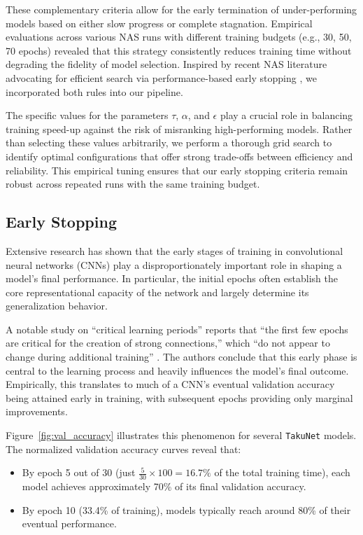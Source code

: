 These complementary criteria allow for the early termination of under-performing models based on either slow progress or complete stagnation. Empirical evaluations across various NAS runs with different training budgets (e.g., 30, 50, 70 epochs) revealed that this strategy consistently reduces training time without degrading the fidelity of model selection. Inspired by recent NAS literature advocating for efficient search via performance-based early stopping \cite{li2020random}, we incorporated both rules into our pipeline.

The specific values for the parameters \( \tau \), \( \alpha \), and \( \epsilon \) play a crucial role in balancing training speed-up against the risk of misranking high-performing models. Rather than selecting these values arbitrarily, we perform a thorough grid search to identify optimal configurations that offer strong trade-offs between efficiency and reliability. This empirical tuning ensures that our early stopping criteria remain robust across repeated runs with the same training budget.






\subsection{Early Stopping}
\label{sec:early_stopping}

Extensive research has shown that the early stages of training in convolutional neural networks (CNNs) play a disproportionately important role in shaping a model’s final performance. In particular, the initial epochs often establish the core representational capacity of the network and largely determine its generalization behavior.

A notable study on “critical learning periods” reports that “the first few epochs are critical for the creation of strong connections,” which “do not appear to change during additional training” \cite{achille2017critical}. The authors conclude that this early phase is central to the learning process and heavily influences the model’s final outcome. Empirically, this translates to much of a CNN’s eventual validation accuracy being attained early in training, with subsequent epochs providing only marginal improvements.

Figure~\ref{fig:val_accuracy} illustrates this phenomenon for several \texttt{TakuNet} models. The normalized validation accuracy curves reveal that:
\begin{itemize}
  \item By epoch 5 out of 30 (just \( \frac{5}{30} \times 100 = 16.7\% \) of the total training time), each model achieves approximately 70\% of its final validation accuracy.
  \item By epoch 10 (33.4\% of training), models typically reach around 80\% of their eventual performance.
\end{itemize}

